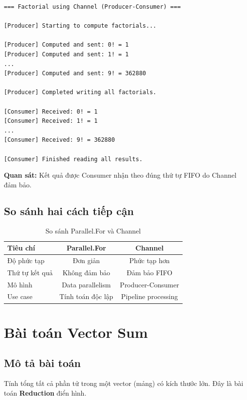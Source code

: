 \documentclass[12pt,a4paper]{article}
\begin{document}
\begin{Verbatim}[frame=single, fontsize=\small]
=== Factorial using Channel (Producer-Consumer) ===

[Producer] Starting to compute factorials...

[Producer] Computed and sent: 0! = 1
[Producer] Computed and sent: 1! = 1
...
[Producer] Computed and sent: 9! = 362880

[Producer] Completed writing all factorials.

[Consumer] Received: 0! = 1
[Consumer] Received: 1! = 1
...
[Consumer] Received: 9! = 362880

[Consumer] Finished reading all results.
\end{Verbatim}

\textbf{Quan sát:} Kết quả được Consumer nhận theo đúng thứ tự FIFO do Channel đảm bảo.

\subsection{So sánh hai cách tiếp cận}

\begin{table}[h]
\centering
\begin{tabular}{|l|c|c|}
\hline
\textbf{Tiêu chí} & \textbf{Parallel.For} & \textbf{Channel} \\
\hline
Độ phức tạp & Đơn giản & Phức tạp hơn \\
\hline
Thứ tự kết quả & Không đảm bảo & Đảm bảo FIFO \\
\hline
Mô hình & Data parallelism & Producer-Consumer \\
\hline
Use case & Tính toán độc lập & Pipeline processing \\
\hline
\end{tabular}
\caption{So sánh Parallel.For và Channel}
\end{table}

\section{Bài toán Vector Sum}

\subsection{Mô tả bài toán}

Tính tổng tất cả phần tử trong một vector (mảng) có kích thước lớn. Đây là bài toán \textbf{Reduction} điển hình.
\end{document}
